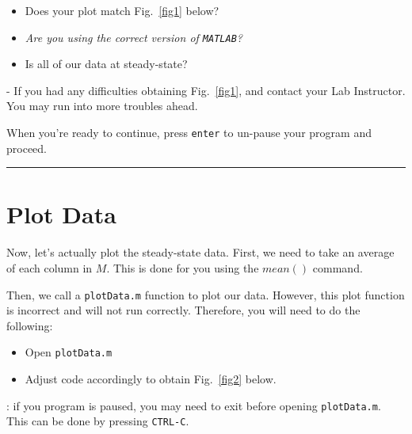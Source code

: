 \documentclass[11pt, letterpaper]{article}
\begin{document}
\begin{formal}
\begin{quest} 
\begin{itemize}
    \item Does your plot match Fig.~\ref{fig1} below? 
    \item \it{Are you using the correct version of \texttt{MATLAB}?} 
    \item Is all of our data at steady-state?
\end{itemize}
\end{quest}
\end{formal}
\begin{center}
\begin{tcolorbox}[enhanced, width=14cm, size=tight, top=-2mm, colback=red!5, colframe=black!50!white, boxrule=0.25pt, boxsep=2mm]
\n
{\small
{} - If you had any difficulties obtaining Fig.~\ref{fig1},  and contact your Lab Instructor. You may run into more troubles ahead.
}
\end{tcolorbox}

\end{center}

When you're ready to continue, press \texttt{enter} to un-pause your program and proceed.

\n
\hrule

\section{Plot Data}

Now, let's actually plot the steady-state data. First,  we need to take an average of each column in $M$. This is done for you using the $mean( )$ command.

Then, we call a \texttt{plotData.m} function to plot our data. However, this plot function is incorrect and will not run correctly.  Therefore, you will need to do the following:
\begin{itemize}
    \item Open \texttt{plotData.m} 
    \item Adjust code accordingly to obtain Fig.~\ref{fig2} below.
\end{itemize}

\Note: if you program is paused, you may need to exit before opening \texttt{plotData.m}. This can be done by pressing \texttt{CTRL-C}.
\end{document}
